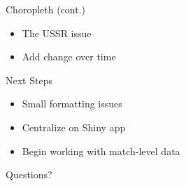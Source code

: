 \documentclass[ignorenonframetext,]{beamer}
\providecommand{\tightlist}{%
  \setlength{\itemsep}{0pt}\setlength{\parskip}{0pt}}
\begin{document}
\begin{frame}{Choropleth (cont.)}
\protect\hypertarget{choropleth-cont.-1}{}

\begin{itemize}[<+->]
\tightlist
\item
  The USSR issue 
\item
  Add change over time
\end{itemize}

\end{frame}

\begin{frame}{Next Steps}
\protect\hypertarget{next-steps}{}

\begin{itemize}[<+->]
\tightlist
\item
  Small formatting issues 
\item
  Centralize on Shiny app 
\item
  Begin working with match-level data 
\end{itemize}

\end{frame}

\begin{frame}{Questions?}
\protect\hypertarget{questions}{}

\end{frame}
\end{document}
